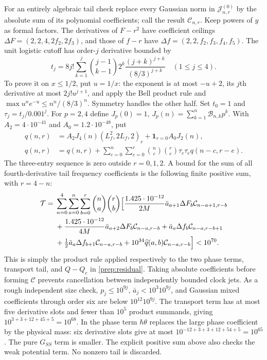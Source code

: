 \documentclass[11pt]{article}
\theoremstyle{definition}\newtheorem{definition}[theorem]{Definition}
\theoremstyle{remark}\newtheorem{remark}[theorem]{Remark}
\newcommand{\one}{\mathbf1}\newcommand{\R}{\mathbb R}\newcommand{\T}{\mathbb T}
\begin{document}
For an entirely algebraic tail check replace every Gaussian norm in
$\mathcal J_{n,r}^{(0)}$ by the absolute sum of its polynomial
coefficients; call the result $\mathcal C_{n,r}$. Keep powers of $y$
as formal factors. The derivatives of $F-r^2$ have coefficient ceilings
$\Delta F=(2,2,4,2f_2,2f_3)$, and those of $f-r$ have
$\Delta f=(2,2,f_2,f_3,f_4,f_5)$. The unit logistic cutoff has
order-$j$ derivative bounded by
\[
 t_j=8j!\sum_{k=1}^j\binom{j-1}{k-1}2^k
                 \frac{(j+k)^{j+k}}{(8/3)^{j+k}}\quad(1\le j\le4).
\]
To prove it on $x\le1/2$, put $u=1/x$: the exponent is at most
$-u+2$, its $j$th derivative at most $2j!u^{j+1}$, and apply the
Bell product rule and $\max u^ne^{-u}\le n^n/(8/3)^n$.
Symmetry handles the other half. Set $t_0=1$ and
$\tau_j=t_j/0.001^j$.
For $p=2,4$ define
$J_p(0)=1$, $J_p(n)=\sum_{k=1}^n\mathcal B_{n,k}p^k$.
With $A_2=4\cdot10^{-41}$ and $A_0=1.2\cdot10^{-48}$, put
\begin{align*}
 q(n,r)&=A_2J_4(n)(L_f^2,2L_f,2)_r
                      +\one_{r=0}A_0J_2(n),\\
 \widehat q(n,r)&=q(n,r)+
   \sum_{c=0}^n\sum_{e=0}^r\binom nc\binom re
                      \tau_c\tau_e q(n-c,r-e).
\end{align*}
The three-entry sequence is zero outside $r=0,1,2$.
A bound for the sum of all fourth-derivative tail frequency coefficients
is the following finite positive sum, with $r=4-n$:
\begin{align}
 \mathcal T={}&\sum_{n=0}^4\sum_{a=0}^n\sum_{b=0}^{r}
 \binom na\binom rb\Bigl[
 \frac{1.425\cdot10^{-12}}{2M}\bar a_{a+1}\Delta F_b
                                      \mathcal C_{n-a+1,r-b}\\
 &+\frac{1.425\cdot10^{-12}}{4M}\bar a_{a+2}\Delta F_b
                                      \mathcal C_{n-a,r-b}
 +\bar a_a\Delta f_b\mathcal C_{n-a,r-b+1}\\
 &+\tfrac12\bar a_a\Delta f_{b+1}\mathcal C_{n-a,r-b}
 +10^{34}\widehat q(a,b)\mathcal C_{n-a,r-b}\Bigr]<10^{70}.
 \label{prep:tail-coefficient}
\end{align}
This is simply the product rule applied respectively to the two phase
terms, transport tail, and $Q-Q_c$ in \eqref{prep:residual}.
Taking absolute coefficients before forming $\mathcal C$ prevents
cancellation between independently bounded clock jets. As a rough
independent size check, $p_j\le10^{9j}$,
$\bar a_j<10^3 10^{9j}$, and Gaussian mixed coefficients through order
six are below $10^{12}10^{9j}$. The transport term has at most five
derivative slots and fewer than $10^5$ product summands, giving
$10^{3+3+12+45+5}=10^{68}$. In the phase term $\hbar\theta$ replaces
the large phase coefficient by the physical mass: six derivative slots
give at most $10^{-12+3+3+12+54+5}=10^{65}$. The pure $G_{SS}$
term is smaller. The explicit positive sum above also checks the weak
potential term. No nonzero tail is discarded.
\end{document}
